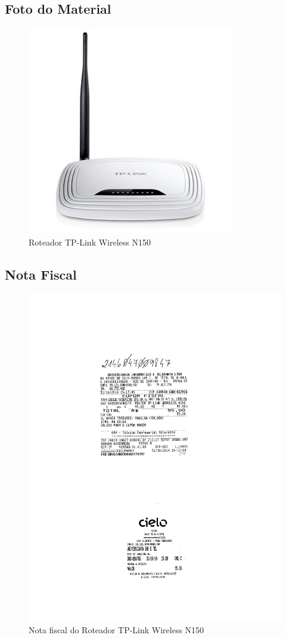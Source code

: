 \subsection{Foto do Material}
\begin{figure}[H]
 \centering
 \includegraphics[width=1\columnwidth]{Roteador/foto.jpg}
 \caption{Roteador TP-Link Wireless N150}
\end{figure}

\subsection{Nota Fiscal}
\begin{figure}[H]
 \centering
 \includegraphics[width=0.9\columnwidth]{Roteador/nota_universidata.pdf}
 \caption{Nota fiscal do Roteador TP-Link Wireless N150}
 \end{figure}